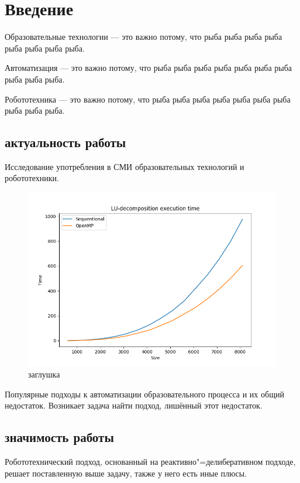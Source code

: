 \chapter{Введение}
Образовательные технологии --- это важно потому, что рыба рыба рыба рыба рыба рыба рыба рыба.

Автоматизация --- это важно потому, что рыба рыба рыба рыба рыба рыба рыба рыба рыба рыба.

Робототехника --- это важно потому, что рыба рыба рыба рыба рыба рыба рыба рыба рыба рыба.
\section{актуальность работы}
Исследование употребления в СМИ образовательных технологий и робототехники. 

\begin{figure}[ht]
    \centering
    \includegraphics[scale=0.7]{../images/mock1.png}
    \caption{заглушка}
\end{figure}

Популярные подходы к автоматизации образовательного процесса и их общий недостаток. Возникает задача найти подход, лишённый этот недостаток.
\section{значимость работы}
Робототехнический подход, основанный на реактивно"=делиберативном подходе, решает поставленную выше задачу, также у него есть иные плюсы.


